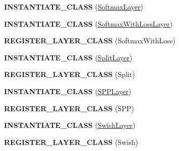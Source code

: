 \begin{DoxyCompactItemize}
\item 
{\bfseries I\+N\+S\+T\+A\+N\+T\+I\+A\+T\+E\+\_\+\+C\+L\+A\+SS} (\hyperlink{classcaffe_1_1SoftmaxLayer}{Softmax\+Layer})\hypertarget{namespacecaffe_a6fa6fe4a2398b265fe5ca12997afbb38}{}\label{namespacecaffe_a6fa6fe4a2398b265fe5ca12997afbb38}

\item 
{\bfseries I\+N\+S\+T\+A\+N\+T\+I\+A\+T\+E\+\_\+\+C\+L\+A\+SS} (\hyperlink{classcaffe_1_1SoftmaxWithLossLayer}{Softmax\+With\+Loss\+Layer})\hypertarget{namespacecaffe_a012dfaa945f436a700b3f0dbf033c893}{}\label{namespacecaffe_a012dfaa945f436a700b3f0dbf033c893}

\item 
{\bfseries R\+E\+G\+I\+S\+T\+E\+R\+\_\+\+L\+A\+Y\+E\+R\+\_\+\+C\+L\+A\+SS} (Softmax\+With\+Loss)\hypertarget{namespacecaffe_a79a031f7f658603ddd8ef283ef085079}{}\label{namespacecaffe_a79a031f7f658603ddd8ef283ef085079}

\item 
{\bfseries I\+N\+S\+T\+A\+N\+T\+I\+A\+T\+E\+\_\+\+C\+L\+A\+SS} (\hyperlink{classcaffe_1_1SplitLayer}{Split\+Layer})\hypertarget{namespacecaffe_a760dd19eb7d418a3629ce7045fe56a6c}{}\label{namespacecaffe_a760dd19eb7d418a3629ce7045fe56a6c}

\item 
{\bfseries R\+E\+G\+I\+S\+T\+E\+R\+\_\+\+L\+A\+Y\+E\+R\+\_\+\+C\+L\+A\+SS} (Split)\hypertarget{namespacecaffe_a497c5806d306e623ed14ab2175ced665}{}\label{namespacecaffe_a497c5806d306e623ed14ab2175ced665}

\item 
{\bfseries I\+N\+S\+T\+A\+N\+T\+I\+A\+T\+E\+\_\+\+C\+L\+A\+SS} (\hyperlink{classcaffe_1_1SPPLayer}{S\+P\+P\+Layer})\hypertarget{namespacecaffe_a899ff19b079c1cb64676bdd08fe8854b}{}\label{namespacecaffe_a899ff19b079c1cb64676bdd08fe8854b}

\item 
{\bfseries R\+E\+G\+I\+S\+T\+E\+R\+\_\+\+L\+A\+Y\+E\+R\+\_\+\+C\+L\+A\+SS} (S\+PP)\hypertarget{namespacecaffe_ab10cdcd5667c76231b739559ac5569e7}{}\label{namespacecaffe_ab10cdcd5667c76231b739559ac5569e7}

\item 
{\bfseries I\+N\+S\+T\+A\+N\+T\+I\+A\+T\+E\+\_\+\+C\+L\+A\+SS} (\hyperlink{classcaffe_1_1SwishLayer}{Swish\+Layer})\hypertarget{namespacecaffe_ab49368559d2968fec001ef97d0904a17}{}\label{namespacecaffe_ab49368559d2968fec001ef97d0904a17}

\item 
{\bfseries R\+E\+G\+I\+S\+T\+E\+R\+\_\+\+L\+A\+Y\+E\+R\+\_\+\+C\+L\+A\+SS} (Swish)\hypertarget{namespacecaffe_a2d73ce0550fb332d0cd1975fa18fd563}{}\label{namespacecaffe_a2d73ce0550fb332d0cd1975fa18fd563}


\end{DoxyCompactItemize}
